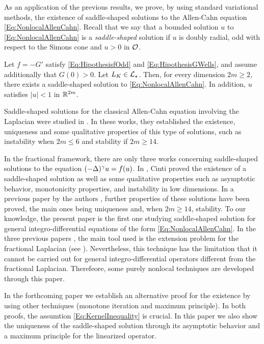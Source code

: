 As an application of the previous results, we prove, by using standard variational methods, the existence of saddle-shaped solutions to the Allen-Cahn equation \eqref{Eq:NonlocalAllenCahn}. Recall that we say that a bounded solution $u$ to \eqref{Eq:NonlocalAllenCahn} is a \emph{saddle-shaped} solution if $u$ is doubly radial, odd with respect to the Simons cone and $u>0$ in $\mathcal{O}$. 

\begin{theorem}
	\label{Th:Existence}
    Let $f=-G'$ satisfy \eqref{Eq:HipothesisfOdd} and \eqref{Eq:HipothesisGWells}, and assume additionally that $G(0)>0$. Let $L_K\in \mathcal{L}_\star$. Then, for every dimension $2m \geq 2$, there exists a saddle-shaped solution to \eqref{Eq:NonlocalAllenCahn}. In addition, $u$ satisfies $|u|<1$ in $\mathbb{R}^{2m}$.
\end{theorem}

Saddle-shaped solutions for the classical Allen-Cahn equation involving the Laplacian were studied in \cite{DangFifePeletier, Schatzman, CabreTerraI,CabreTerraII, Cabre-Saddle}. In these works, they established the existence, uniqueness and some qualitative properties of this type of solutions, such as instability when $2m\leq 6$ and stability if $2m\geq 14$.

In the fractional framework, there are only three works concerning saddle-shaped solutions to the equation $(-\Delta)^\gamma u = f(u)$. In  \cite{Cinti-Saddle,Cinti-Saddle2}, Cinti proved the existence of a saddle-shaped solution as well as some qualitative properties such as asymptotic behavior, monotonicity properties, and instability in low dimensions. In a previous paper by the authors \cite{Felipe-Sanz-Perela:SaddleFractional}, further properties of these solutions have been proved, the main ones being uniqueness and, when $2m\geq 14$, stability. To our knowledge, the present paper is the first one studying saddle-shaped solution for general integro-differential equations of the form \eqref{Eq:NonlocalAllenCahn}. In the three previous papers \cite{Cinti-Saddle, Cinti-Saddle2, Felipe-Sanz-Perela:SaddleFractional}, the main tool used is the extension problem for the fractional Laplacian (see \cite{CaffarelliSilvestre}). Nevertheless, this technique has the limitation that it cannot be carried out for general integro-differential operators different from the fractional Laplacian. Therefeore, some purely nonlocal techniques are developed through this paper.

In the forthcoming paper \cite{FelipeSanz-Perela:IntegroDifferentialII} we establish an alternative proof for the existence by using other techniques (monotone iteration and maximum principle). In both proofs, the assumtion \eqref{Eq:KernelInequality} is crucial. In this paper we also show the uniqueness of the saddle-shaped solution through its asymptotic behavior and a maximum principle for the linearized operator.

